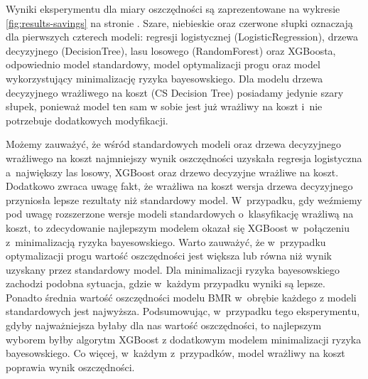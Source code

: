 \documentclass[inzynierska]{pwr_wmat_praca_dyplomowa}
\theoremstyle{plain}
\numberwithin{theorem}{chapter}
\theoremstyle{definition}
\numberwithin{theorem}{chapter}
\begin{document}
Wyniki eksperymentu dla miary oszczędności są zaprezentowane na wykresie \ref{fig:results-savings} na stronie \pageref{fig:results-savings}. Szare, niebieskie oraz czerwone słupki oznaczają dla pierwszych czterech modeli: regresji logistycznej (LogisticRegression), drzewa decyzyjnego (DecisionTree), lasu losowego (RandomForest) oraz XGBoosta, odpowiednio model standardowy, model optymalizacji progu oraz model wykorzystujący minimalizację ryzyka bayesowskiego. Dla modelu drzewa decyzyjnego wrażliwego na koszt (CS Decision Tree) posiadamy jedynie szary słupek, ponieważ model ten sam w sobie jest już wrażliwy na koszt i~nie potrzebuje dodatkowych modyfikacji. 

Możemy zauważyć, że wśród standardowych modeli oraz drzewa decyzyjnego wrażliwego na koszt najmniejszy wynik oszczędności uzyskała regresja logistyczna a~największy las losowy, XGBoost oraz drzewo decyzyjne wrażliwe na koszt. Dodatkowo zwraca uwagę fakt, że wrażliwa na koszt wersja drzewa decyzyjnego przyniosła lepsze rezultaty niż standardowy model. W~przypadku, gdy weźmiemy pod uwagę rozszerzone wersje modeli standardowych o~klasyfikację wrażliwą na koszt, to zdecydowanie najlepszym modelem okazał się XGBoost w~połączeniu z~minimalizacją ryzyka bayesowskiego. Warto zauważyć, że w~przypadku optymalizacji progu wartość oszczędności jest większa lub równa niż wynik uzyskany przez standardowy model. Dla minimalizacji ryzyka bayesowskiego zachodzi podobna sytuacja, gdzie w~każdym przypadku wyniki są lepsze. Ponadto średnia wartość oszczędności modelu BMR w~obrębie każdego z modeli standardowych jest najwyższa. Podsumowując, w~przypadku tego eksperymentu, gdyby najważniejsza byłaby dla nas wartość oszczędności, to najlepszym wyborem byłby algorytm XGBoost z dodatkowym modelem minimalizacji ryzyka bayesowskiego. Co więcej, w~każdym z~przypadków, model wrażliwy na koszt poprawia wynik oszczędności.
\end{document}
